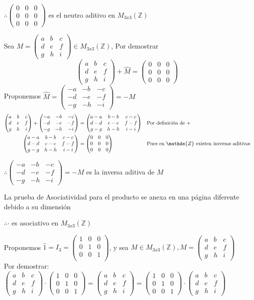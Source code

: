 \documentclass[letterpaper]{article}
\newcommand{\Ceros}{\begin{pmatrix}
		0 & 0 & 0\\
		0 & 0 & 0\\
		0 & 0 & 0 
\end{pmatrix}}
\newcommand{\Iden}{\begin{pmatrix}
		1 & 0 & 0\\
		0 & 1 & 0\\
		0 & 0 & 1 
\end{pmatrix}}
\newcommand{\Mmat}{\begin{pmatrix}
		a & b & c\\
		d & e & f\\
		g & h & i
\end{pmatrix}}
\newcommand{\mtt}{M_{3x3}(\mathds{Z})}
\newcommand{\Z}{\mathds{Z}}
\renewcommand{\*}{\cdot}
\theoremstyle{definition}
\begin{document}
\begin{center}
	$ \therefore \Ceros $ es el neutro aditivo en $ \mtt $
\end{center}
Sea $ M = \Mmat \in \mtt $, Por demostrar $$ \Mmat + \hat{M} = \Ceros $$
Proponemos $ \hat{M} = \begin{pmatrix}
-a & -b & -c\\
-d & -e & -f\\
-g & -h & -i
\end{pmatrix}  = -M$
\begin{align*}
	\Mmat + \begin{pmatrix}
	-a & -b & -c\\
	-d & -e & -f\\
	-g & -h & -i
	\end{pmatrix} & = \begin{pmatrix}
	a-a & b-b & c-c\\
	d-d & e-e & f-f\\
	g-g & h-h & i-i
	\end{pmatrix} && \text{Por definición de +}\\
	\begin{pmatrix}
	a-a & b-b & c-c\\
	d-d & e-e & f-f\\
	g-g & h-h & i-i
	\end{pmatrix} & = \Ceros &&\text{Pues en $ \Z $ existen inversos aditivos}
\end{align*}
\begin{center}
	$ \therefore \begin{pmatrix}
	-a & -b & -c\\
	-d & -e & -f\\
	-g & -h & -i
	\end{pmatrix} = -M $ es la inversa aditiva de $ M $
\end{center}
La prueba de Asociatividad para el producto se anexa en una página diferente debido a su dimensión
\begin{center}
	$ \therefore \* $ es asociativo en $ \mtt $
\end{center}
Proponemos $  \hat{1} = I_3 = \begin{pmatrix}
	1 & 0 & 0\\
	0 & 1 & 0\\
	0 & 0 & 1\\
\end{pmatrix} $, y sea $ M \in \mtt, M = \Mmat $\\
Por demostrar: $ \Mmat \* \Iden = \Mmat = \Iden \* \Mmat $
\end{document}
